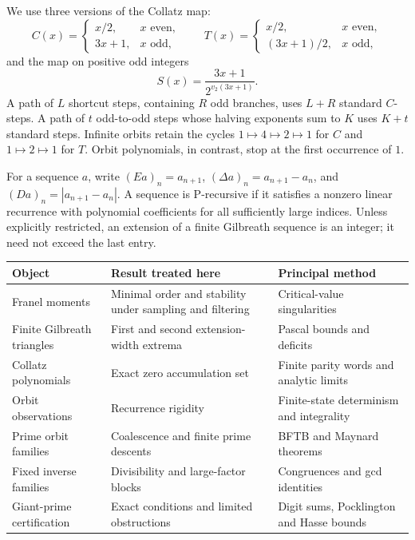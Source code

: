 \documentclass[11pt,a4paper]{article}
\theoremstyle{definition}
\theoremstyle{remark}
\numberwithin{equation}{section}
\begin{document}
We use three versions of the Collatz map:
\[
C(x)=\begin{cases}x/2,&x\text{ even},\\3x+1,&x\text{ odd},\end{cases}
\qquad
T(x)=\begin{cases}x/2,&x\text{ even},\\(3x+1)/2,&x\text{ odd},\end{cases}
\]
and the map on positive odd integers
\[
S(x)=\frac{3x+1}{2^{v_2(3x+1)}}.
\]
A path of $L$ shortcut steps, containing $R$ odd branches, uses $L+R$
standard $C$-steps. A path of $t$ odd-to-odd steps whose halving exponents
sum to $K$ uses $K+t$ standard steps. Infinite orbits retain the cycles
$1\mapsto4\mapsto2\mapsto1$ for $C$ and $1\mapsto2\mapsto1$ for $T$.
Orbit polynomials, in contrast, stop at the first occurrence of $1$.

For a sequence $a$, write $(Ea)_n=a_{n+1}$, $(\Delta a)_n=a_{n+1}-a_n$,
and $(Da)_n=|a_{n+1}-a_n|$. A sequence is P-recursive if it satisfies a
nonzero linear recurrence with polynomial coefficients for all sufficiently
large indices. Unless explicitly restricted, an extension of a finite
Gilbreath sequence is an integer; it need not exceed the last entry.

\begin{center}\small
\begin{tabular}{p{}p{}p{}}
\toprule
Object & Result treated here & Principal method\\\midrule
Franel moments & Minimal order and stability under sampling and filtering & Critical-value singularities\\
Finite Gilbreath triangles & First and second extension-width extrema & Pascal bounds and deficits\\
Collatz polynomials & Exact zero accumulation set & Finite parity words and analytic limits\\
Orbit observations & Recurrence rigidity & Finite-state determinism and integrality\\
Prime orbit families & Coalescence and finite prime descents & BFTB and Maynard theorems\\
Fixed inverse families & Divisibility and large-factor blocks & Congruences and gcd identities\\
Giant-prime certification & Exact conditions and limited obstructions & Digit sums, Pocklington and Hasse bounds\\
\bottomrule
\end{tabular}
\end{center}
\end{document}
